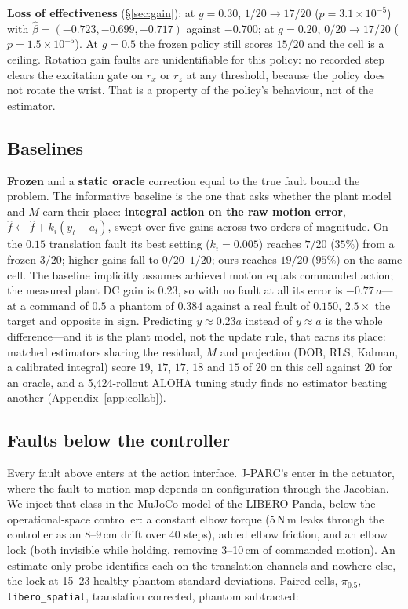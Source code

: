 \documentclass{article}
\newcommand{\fhat}{\hat{f}}
\newcommand{\code}[1]{\texttt{\small #1}}
\begin{document}
\textbf{Loss of effectiveness} (\S\ref{sec:gain}): at $g=0.30$, $1/20\to17/20$
($p=3.1\times10^{-5}$) with $\hat\beta = (-0.723,-0.699,-0.717)$ against $-0.700$; at
$g=0.20$, $0/20\to17/20$ ($p=1.5\times10^{-5}$). At $g=0.5$ the frozen policy still scores
$15/20$ and the cell is a ceiling. Rotation gain faults are unidentifiable for this policy:
no recorded step clears the excitation gate on $r_x$ or $r_z$ at any threshold, because the
policy does not rotate the wrist. That is a property of the policy's behaviour, not of the
estimator.

\subsection{Baselines}
\label{sec:baselines}

\textbf{Frozen} and a \textbf{static oracle} correction equal to the true fault bound the
problem. The informative baseline is the one that asks whether the plant model and $M$ earn
their place: \textbf{integral action on the raw motion error}, $\fhat \leftarrow \fhat +
k_i(y_t - a_t)$, swept over five gains across two orders of magnitude. On the $0.15$
translation fault its best setting ($k_i=0.005$) reaches $7/20$ ($35\%$) from a frozen
$3/20$; higher gains fall to $0/20$--$1/20$; ours reaches $19/20$ ($95\%$) on the same
cell. The baseline implicitly assumes achieved motion equals commanded action; the measured plant
DC gain is $0.23$, so with no fault at all its error is $-0.77\,a$---at a command of $0.5$
a phantom of $0.384$ against a real fault of $0.150$, $2.5\times$ the target and opposite in
sign. Predicting $y\approx0.23a$ instead of $y\approx a$ is the whole difference---and it is
the plant model, not the update rule, that earns its place: matched estimators sharing the
residual, $M$ and projection (DOB, RLS, Kalman, a calibrated integral) score $19$, $17$, $17$,
$18$ and $15$ of 20 on this cell against $20$ for an oracle, and a 5,424-rollout ALOHA tuning
study finds no estimator beating another (Appendix~\ref{app:collab}).

\subsection{Faults below the controller}
\label{sec:joint}

Every fault above enters at the action interface. J-PARC's enter in the actuator, where
the fault-to-motion map depends on configuration through the Jacobian. We inject that
class in the MuJoCo model of the LIBERO Panda, below the operational-space controller: a
constant elbow torque (5\,N\,m leaks through the controller as an 8--9\,cm drift over 40
steps), added elbow friction, and an elbow lock (both invisible while holding, removing
3--10\,cm of commanded motion). An estimate-only probe identifies each on the translation
channels and nowhere else, the lock at 15--23 healthy-phantom standard deviations. Paired
cells, $\pi_{0.5}$, \code{libero\_spatial}, translation corrected, phantom subtracted:
\end{document}
